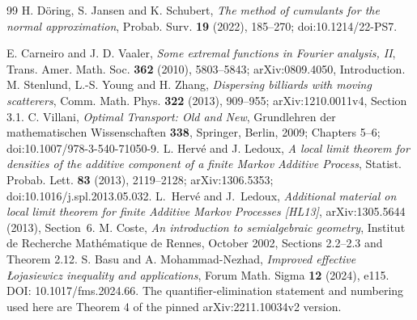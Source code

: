 \begin{thebibliography}{99}
 H. D\"oring, S. Jansen and K. Schubert,
\emph{The method of cumulants for the normal approximation},
Probab. Surv. \textbf{19} (2022), 185--270; doi:10.1214/22-PS7.

 E. Carneiro and J. D. Vaaler,
\emph{Some extremal functions in Fourier analysis, II},
Trans. Amer. Math. Soc. \textbf{362} (2010), 5803--5843;
arXiv:0809.4050, Introduction.
 M. Stenlund, L.-S. Young and H. Zhang,
\emph{Dispersing billiards with moving scatterers},
Comm. Math. Phys. \textbf{322} (2013), 909--955;
arXiv:1210.0011v4, Section 3.1.
 C. Villani, \emph{Optimal Transport: Old and New},
Grundlehren der mathematischen Wissenschaften \textbf{338}, Springer,
Berlin, 2009; Chapters 5--6; doi:10.1007/978-3-540-71050-9.
 L. Herv\'e and J. Ledoux,
\emph{A local limit theorem for densities of the additive component of a
finite Markov Additive Process}, Statist. Probab. Lett. \textbf{83}
(2013), 2119--2128; arXiv:1306.5353; doi:10.1016/j.spl.2013.05.032.
L.~Herv\'e and J.~Ledoux,
\emph{Additional material on local limit theorem for finite Additive
Markov Processes [HL13]}, arXiv:1305.5644 (2013), Section~6.
 M. Coste, \emph{An introduction to semialgebraic geometry},
Institut de Recherche Math\'ematique de Rennes, October 2002,
Sections 2.2--2.3 and Theorem 2.12.
S. Basu and A. Mohammad-Nezhad,
\emph{Improved effective \L ojasiewicz inequality and applications},
Forum Math. Sigma \textbf{12} (2024), e115.
DOI: 10.1017/fms.2024.66.
The quantifier-elimination statement and numbering used here are
Theorem 4 of the pinned arXiv:2211.10034v2 version.

\end{thebibliography}

